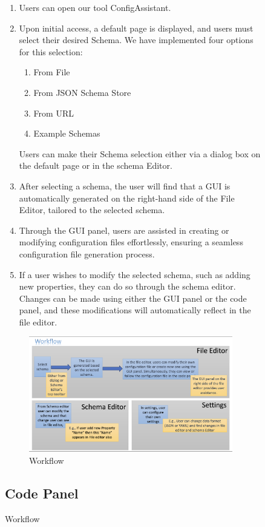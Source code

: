 \begin{figure}[h]
\begin{enumerate}
    \item Users can open our tool ConfigAssistant. %
    \item Upon initial access, a default page is displayed, and users must select their desired Schema.
    We have implemented four options for this selection:
    \begin{enumerate}
        \item From File
        \item From JSON Schema Store
        \item From URL
        \item Example Schemas
    \end{enumerate}
    Users can make their Schema selection either via a dialog box on the default page or in the schema Editor.
    \item After selecting a schema, the user will find that a GUI is automatically generated on the right-hand side of the File Editor, tailored to the selected schema.
    \item Through the GUI panel, users are assisted in creating or modifying configuration files effortlessly, ensuring a seamless configuration file generation process.
    \item If a user wishes to modify the selected schema, such as adding new properties, they can do so through the schema editor.
    Changes can be made using either the GUI panel or the code panel, and these modifications will automatically reflect in the file editor.
\end{enumerate}

\begin{figure}[!htb]
    \begin{minipage}[t]{0.5\textwidth}
        \includegraphics[width=3.5in]{figures/Toolworkflow}
        \caption{Workflow}
        \label{workflow}
    \end{minipage}\label{fig:workflow}
\end{figure}
\subsection{Code Panel}\label{subsec:code-editor}


\end{figure}
